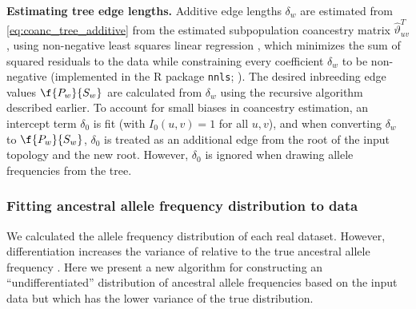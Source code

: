 \documentclass[11pt]{article}
\begin{document}
\textbf{Estimating tree edge lengths.}
Additive edge lengths $\delta_w$ are estimated from \cref{eq:coanc_tree_additive} from the estimated subpopulation coancestry matrix $\hat{\vartheta}_{uv}^T$, using non-negative least squares linear regression \citep{lawson_solving_1974}, which minimizes the sum of squared residuals to the data while constraining every coefficient $\delta_w$ to be non-negative (implemented in the R package \texttt{nnls}; \cite{mullen_nnls_2012}).
The desired inbreeding edge values $\f{P_w}{S_w}$ are calculated from $\delta_w$ using the recursive algorithm described earlier.
To account for small biases in coancestry estimation, an intercept term $\delta_0$ is fit (with $I_0(u,v) = 1$ for all $u,v$), and when converting $\delta_w$ to $\f{P_w}{S_w}$, $\delta_0$ is treated as an additional edge from the root of the input topology and the new root.
However, $\delta_0$ is ignored when drawing allele frequencies from the tree.

\subsubsection{Fitting ancestral allele frequency distribution to data}

We calculated the allele frequency distribution \pith of each real dataset.
However, differentiation increases the variance of \pith relative to the true ancestral allele frequency \pit \citep{ochoa_estimating_2021}.
Here we present a new algorithm for constructing an ``undifferentiated'' distribution of ancestral allele frequencies based on the input data \pith but which has the lower variance of the true \pit distribution.
\end{document}

